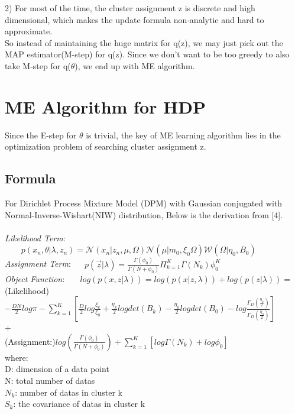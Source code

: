 \documentclass{article}
\begin{document}
2) For most of the time, the cluster assignment z is discrete and high dimensional, which makes the update formula non-analytic and hard to approximate. \\

So instead of maintaining the huge matrix for q(z), we may just pick out the MAP estimator(M-step) for q(z).
Since we don't want to be too greedy to also take M-step for q($\theta$), we end up with ME algorithm.


\section{ME Algorithm for HDP}  
Since the E-step for $\theta$ is trivial, the key of ME learning algorithm lies in the optimization problem of searching cluster assignment z.
\subsection{Formula}
For Dirichlet Process Mixture Model (DPM) with Gaussian conjugated with Normal-Inverse-Wishart(NIW) distribution, Below is the derivation from [4].\\ \\ 
\emph{Likelihood Term}:$\ \ \ \ \ \ \ \ \ p(x_{n},\theta|\lambda,z_{n})=\mathcal{N}(x_{n}|z_{n},\mu,\Omega)
\mathcal{N}(\mu|m_{0},\xi_{0}\Omega)\mathcal{W}(\Omega|\eta_{0},B_{0})$\\ 
\emph{Assignment Term}: $\ \ \ \ \ \ p(\vec z|\lambda)=\frac{\Gamma(\phi_{0})}{\Gamma(N+\phi_{0})}\Pi_{k=1}^{K}\Gamma(N_{k}) \phi_{0}^{K}$\\
\emph{Object Function}: $\ \ \ \ \ \ \ log(p(x,z|\lambda))=log(p(x|z,\lambda))+log(p(z|\lambda))=$\\
(Likelihood)$ -\frac{D N}{2}log\pi-\sum_{k=1}^{K} [\frac{D}{2}log\frac{\xi_{k}}{\xi_{0}}+\frac{\eta_{k}}{2}log det(B_{k})-\frac{\eta_{0}}{2}log det(B_{0})
-log \frac{\Gamma_{D}(\frac{\eta_{k}}{2})}{\Gamma_{D}(\frac{\eta_{0}}{2})}]$
\\
+
\\
(Assignment:)$log(\frac{\Gamma(\phi_{0})}{\Gamma(N+\phi_{0})})+\sum_{k=1}^{K}[log \Gamma(N_{k})+log\phi_{0}]$\\ 
where:\\
D: dimension of a data point\\ 
N: total number of datas\\ 
$N_{k}$: number of datas in cluster k\\ 
$S_{k}$: the covariance of datas in cluster k\\ 
\end{document}
